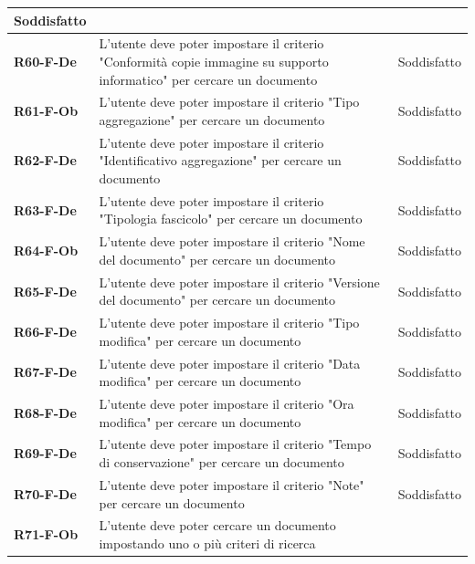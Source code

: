 \documentclass[a4paper,12pt]{article}
\begin{document}
{{{\begin{longtable}{|>{\centering\arraybackslash}m{}|>{\centering\arraybackslash}m{}|>{\centering\arraybackslash}m{}|}
                Soddisfatto \\ 
                \hline
                \textbf{R60-F-De} & L'utente deve poter impostare il criterio "Conformità copie immagine su supporto informatico" per cercare un documento & 
                Soddisfatto \\ 
                \hline
                \textbf{R61-F-Ob} & L'utente deve poter impostare il criterio "Tipo aggregazione" per cercare un documento & 
                Soddisfatto \\ 
                \hline
                \textbf{R62-F-De} & L'utente deve poter impostare il criterio "Identificativo aggregazione" per cercare un documento & 
                Soddisfatto \\ 
                \hline
                \textbf{R63-F-De} & L'utente deve poter impostare il criterio "Tipologia fascicolo" per cercare un documento & 
                Soddisfatto \\ 
                \hline
                \textbf{R64-F-Ob} & L'utente deve poter impostare il criterio "Nome del documento" per cercare un documento & 
                Soddisfatto \\ 
                \hline
                \textbf{R65-F-De} & L'utente deve poter impostare il criterio "Versione del documento" per cercare un documento & 
                Soddisfatto \\ 
                \hline
                \textbf{R66-F-De} & L'utente deve poter impostare il criterio "Tipo modifica" per cercare un documento & 
                Soddisfatto \\ 
                \hline
                \textbf{R67-F-De} & L'utente deve poter impostare il criterio "Data modifica" per cercare un documento & 
                Soddisfatto \\ 
                \hline
                \textbf{R68-F-De} & L'utente deve poter impostare il criterio "Ora modifica" per cercare un documento & 
                Soddisfatto \\ 
                \hline
                \textbf{R69-F-De} & L'utente deve poter impostare il criterio "Tempo di conservazione" per cercare un documento & 
                Soddisfatto \\ 
                \hline
                \textbf{R70-F-De} & L'utente deve poter impostare il criterio "Note" per cercare un documento & 
                Soddisfatto \\ 
                \hline
                \textbf{R71-F-Ob} & L'utente deve poter cercare un documento impostando uno o più criteri di ricerca & 

\end{longtable}}}}
\end{document}
